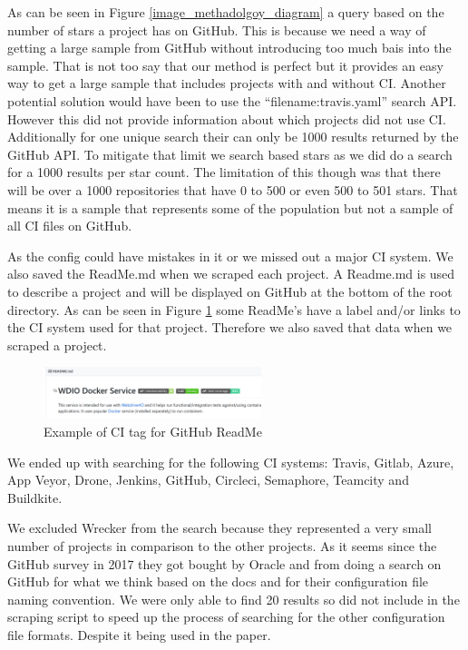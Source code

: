 \documentclass[10pt,conference]{IEEEtran}
\begin{document}
As can be seen in Figure \ref{image_methadolgoy_diagram} a query based on the number of stars a project has on GitHub. This is because we need a way of getting a large sample from GitHub without introducing too much bais into the sample. That is not too say that our method is perfect but it provides an easy way to get a large sample that includes projects with and without CI.
Another potential solution would have been to use the \enquote{filename:travis.yaml} search API. However this did not provide information about which projects did not use CI. Additionally for one unique search their can only be 1000 results returned by the GitHub API. To mitigate that limit we search based stars as we did do a search for a 1000 results per star count. The limitation of this though was that there will be over a 1000 repositories that have 0 to 500 or even 500 to 501 stars. That means it is a sample that represents some of the population but not a sample of all CI files on GitHub. 

As the config could have mistakes in it or we missed out a major CI system. We also saved the ReadMe.md when we scraped each project. A Readme.md is used to describe a project and will be displayed on GitHub at the bottom of the root directory. As can be seen in Figure \ref{ExampleGitHubReadme} some ReadMe's have a label and/or links to the CI system used for that project. Therefore we also saved that data when we scraped a project. 

\begin{figure}[!t]
  \centering
  \includegraphics[scale=0.5, width=2.5in]{2020-01-30-08-29-04.png}
  
  \caption[alt text]{Example of CI tag for GitHub ReadMe \cite{GithubReadMeExample}}
  \label{ExampleGitHubReadme}
\end{figure}

We ended up with searching for the following CI systems: Travis, Gitlab, Azure, App Veyor, Drone, Jenkins, GitHub, Circleci, Semaphore, Teamcity and Buildkite. 

We excluded Wrecker from the search because they represented a very small number of projects in comparison to the other projects. As it seems since the GitHub survey in 2017 they got bought by Oracle and from doing a search on GitHub for what we think based on the docs \cite{WreckerDocs} and \cite{WreckerOpenSourceGithubSearch} for their configuration file naming convention. We were only able to find 20 results so did not include in the scraping script to speed up the process of searching for the other configuration file formats. Despite it being used in the \citet{Hilton2016} paper.
\end{document}
